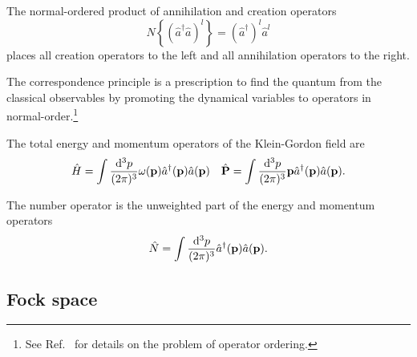 \begin{definition}
	The normal-ordered product of annihilation and creation operators
	\begin{equation}
		N\left\{
			\left(
				\hat{a}^\dagger
				\hat{a}
			\right)^l
		\right\}
		=
		\left(\hat{a}^\dagger\right)^l
		\hat{a}^l
	\end{equation}
	places all creation operators to the left and all annihilation operators to the right.
\end{definition}
\begin{definition}
	The correspondence principle is a prescription to find the quantum from the classical observables by promoting the dynamical variables to operators in normal-order.\footnote{See Ref.~\cite[p.~20]{Mukhanov2007} for details on the problem of operator ordering.}
\end{definition}
\begin{corollary}
	The total energy and momentum operators of the Klein-Gordon field are
	\begin{align}
		\hat{H}
		=
		\int\frac{\dd[3]{p}}{(2\pi)^3}
		\omega(\vb{p})\hat{a}^\dagger(\vb{p})\hat{a}(\vb{p})
		&&
		\hat{\vb{P}}
		=
		\int\frac{\dd[3]{p}}{(2\pi)^3}
		\vb{p}\hat{a}^\dagger(\vb{p})\hat{a}(\vb{p})
		\label{eq:qkg_energy_momentum}
		.
	\end{align}
\end{corollary}
\begin{corollary}
	The number operator is the unweighted part of the energy and momentum operators
	\begin{equation}
		\hat{N}
		=
		\int\frac{\dd[3]{p}}{(2\pi)^3}
		\hat{a}^\dagger(\vb{p})
		\hat{a}(\vb{p})
		\label{eq:qkg_number}
		.
	\end{equation}
\end{corollary}

\subsection{Fock space}

